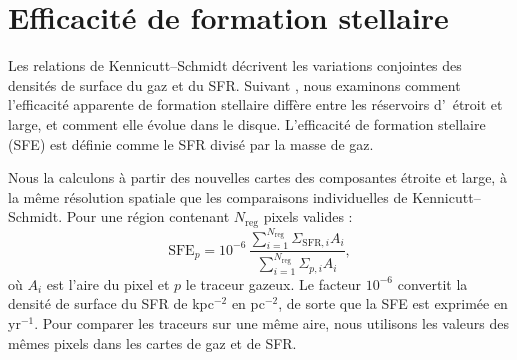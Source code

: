 \begingroup
\raggedbottom
\setlength{\parskip}{6pt}
\section[Efficacité de formation stellaire]{Efficacité de formation stellaire}
\label{sec:sfe}

Les relations de Kennicutt--Schmidt décrivent les variations conjointes des densités de surface du gaz et du SFR. Suivant \citet{Leroy2008}, nous examinons comment l'efficacité apparente de formation stellaire diffère entre les réservoirs d'\HI\ étroit et large, et comment elle évolue dans le disque. L'efficacité de formation stellaire (SFE) est définie comme le SFR divisé par la masse de gaz.

Nous la calculons à partir des nouvelles cartes des composantes étroite et large, à la même résolution spatiale que les comparaisons individuelles de Kennicutt--Schmidt. Pour une région contenant $N_{\mathrm{reg}}$ pixels valides :
\begin{equation}
\label{eq:regional_sfe}
\mathrm{SFE}_p = 10^{-6}\,
\frac{\displaystyle\sum_{i=1}^{N_{\mathrm{reg}}}\Sigma_{\mathrm{SFR},i} A_i}
{\displaystyle\sum_{i=1}^{N_{\mathrm{reg}}}\Sigma_{p,i} A_i},
\end{equation}
\noindent où $A_i$ est l'aire du pixel et $p$ le traceur gazeux. Le facteur $10^{-6}$ convertit la densité de surface du SFR de kpc$^{-2}$ en pc$^{-2}$, de sorte que la SFE est exprimée en yr$^{-1}$. Pour comparer les traceurs sur une même aire, nous utilisons les valeurs des mêmes pixels dans les cartes de gaz et de SFR.

